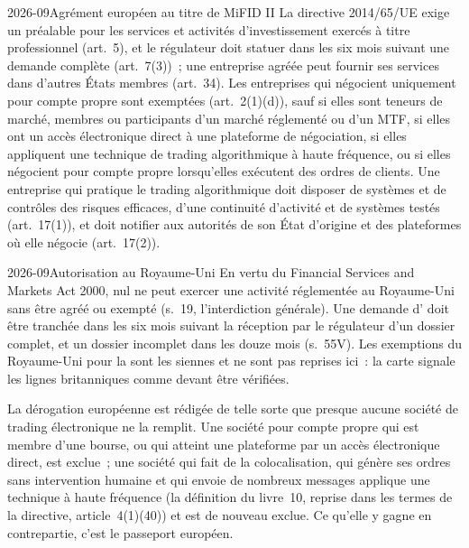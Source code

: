 \begin{dated}{2026-09}{Agrément européen au titre de MiFID II}\label{dat:fm:regulators-and-licences:eu}
La directive 2014/65/UE exige un  préalable pour les services et activités d'investissement exercés à titre professionnel (art.~5), et le
régulateur doit statuer dans les six mois suivant une demande complète (art.~7(3))~; une entreprise agréée peut fournir ses services dans d'autres États membres
(art.~34). Les entreprises qui négocient uniquement pour compte propre sont exemptées (art.~2(1)(d)), sauf si elles sont teneurs de marché, membres ou participants d'un marché réglementé
ou d'un MTF, si elles ont un accès électronique direct à une plateforme de négociation, si elles appliquent une technique de trading algorithmique à haute fréquence, ou si elles négocient pour compte propre
lorsqu'elles exécutent des ordres de clients. Une entreprise qui pratique le trading algorithmique doit disposer de systèmes et de contrôles des risques efficaces, d'une continuité d'activité et de systèmes testés
(art.~17(1)), et doit notifier aux autorités de son État d'origine et des plateformes où elle négocie (art.~17(2)).
\end{dated}

\begin{dated}{2026-09}{Autorisation au Royaume-Uni}\label{dat:fm:regulators-and-licences:uk}
En vertu du Financial Services and Markets Act 2000, nul ne peut exercer une activité réglementée au Royaume-Uni sans être agréé ou exempté
(s.~19, l'interdiction générale). Une demande d' doit être tranchée dans les six mois suivant la réception par le régulateur d'un dossier complet, et un dossier incomplet
dans les douze mois (s.~55V). Les exemptions du Royaume-Uni pour la  sont les siennes et ne sont pas reprises ici~: la carte signale
les lignes britanniques comme devant être vérifiées.
\end{dated}

La dérogation européenne est rédigée de telle sorte que presque aucune société de trading électronique ne la remplit. Une société pour compte propre qui est membre d'une bourse, ou qui
atteint une plateforme par un accès électronique direct, est exclue~; une société qui fait de la colocalisation, qui génère ses ordres sans intervention humaine et qui envoie de nombreux
messages applique une technique à haute fréquence (la définition du livre~10, reprise dans les termes de la directive, article~4(1)(40)) et est de nouveau exclue. Ce qu'elle y gagne
en contrepartie, c'est le passeport européen.

